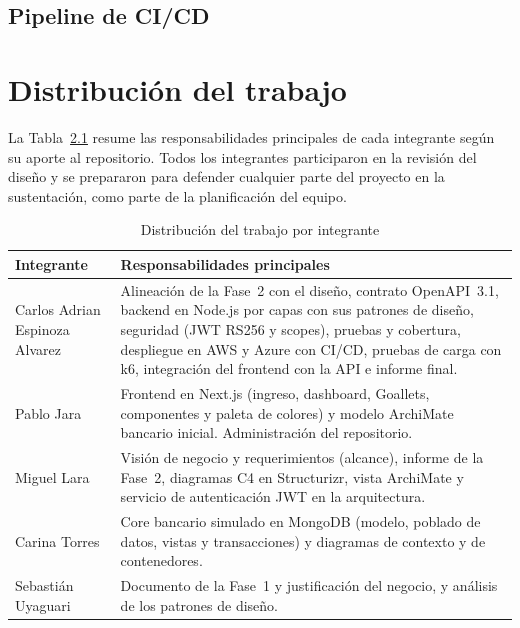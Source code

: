 \section{Pipeline de CI/CD}


\chapter{Distribución del trabajo}\label{anx:equipo}

La Tabla~\ref{tab:equipo} resume las responsabilidades principales de cada integrante según su aporte al repositorio. Todos los integrantes participaron en la revisión del diseño y se prepararon para defender cualquier parte del proyecto en la sustentación, como parte de la planificación del equipo.

\begin{table}[H]
\centering
\caption{Distribución del trabajo por integrante}\label{tab:equipo}
\begin{tabularx}{\linewidth}{@{}>{\raggedright}p{4.2cm} X@{}}
\toprule
\textbf{Integrante} & \textbf{Responsabilidades principales} \\
\midrule
Carlos Adrian Espinoza Alvarez & Alineación de la Fase~2 con el diseño, contrato OpenAPI~3.1, backend en Node.js por capas con sus patrones de diseño, seguridad (JWT RS256 y scopes), pruebas y cobertura, despliegue en AWS y Azure con CI/CD, pruebas de carga con k6, integración del frontend con la API e informe final. \\
Pablo Jara & Frontend en Next.js (ingreso, dashboard, Goallets, componentes y paleta de colores) y modelo ArchiMate bancario inicial. Administración del repositorio. \\
Miguel Lara & Visión de negocio y requerimientos (alcance), informe de la Fase~2, diagramas C4 en Structurizr, vista ArchiMate y servicio de autenticación JWT en la arquitectura. \\
Carina Torres & Core bancario simulado en MongoDB (modelo, poblado de datos, vistas y transacciones) y diagramas de contexto y de contenedores. \\
Sebastián Uyaguari & Documento de la Fase~1 y justificación del negocio, y análisis de los patrones de diseño. \\
\bottomrule
\end{tabularx}
\end{table}
